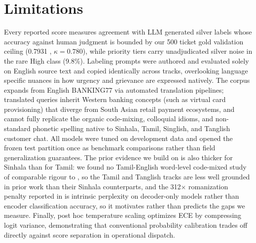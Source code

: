 \section{Limitations}
\label{sec:limitations}

Every reported score measures agreement with LLM generated silver labels whose accuracy against human judgment is bounded by our 500 ticket gold validation ceiling (0.7931 \negf{}, $\kappa = 0.780$), while priority tiers carry unadjudicated silver noise in the rare High class (9.8\%). Labeling
prompts were authored and evaluated solely on English source text and copied identically across tracks,
overlooking language specific nuances in how urgency and grievance are expressed natively. The corpus expands from English BANKING77 via automated translation pipelines; translated queries inherit Western banking concepts (such as virtual card provisioning) that diverge from South Asian retail payment ecosystems, and cannot fully replicate the organic code-mixing, colloquial idioms, and non-standard phonetic spelling native to Sinhala, Tamil, Singlish, and Tanglish customer chat. All models were tuned on development data and opened the frozen test partition once as benchmark comparisons rather than field generalization guarantees. The prior evidence we build on is also thicker for Sinhala than for Tamil: we found no Tamil-English word-level code-mixed study of comparable rigour to \cite{smith2020codemixed}, so the Tamil and Tanglish tracks are less well grounded in prior work than their Sinhala counterparts, and the 312$\times$ romanization penalty reported in \cite{rajapakse2026script} is intrinsic perplexity on decoder-only models rather than encoder classification accuracy, so it motivates rather than predicts the gaps we measure. Finally, post hoc temperature scaling optimizes ECE by compressing logit variance, demonstrating that conventional probability calibration trades off directly against score separation in operational dispatch.
